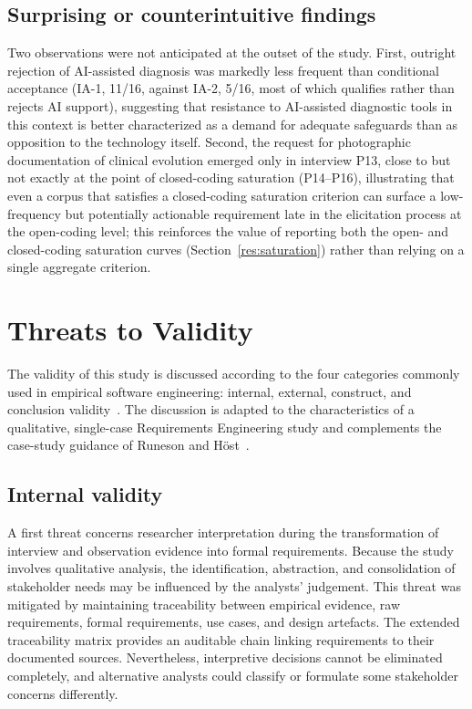 \documentclass[pdflatex,sn-mathphys-num,Numbered]{sn-jnl}
\begin{document}
\subsection{Surprising or counterintuitive findings}\label{disc:surprising}

Two observations were not anticipated at the outset of the study. First, outright rejection of AI-assisted diagnosis was markedly less frequent than conditional acceptance (IA-1, 11/16, against IA-2, 5/16, most of which qualifies rather than rejects AI support), suggesting that resistance to AI-assisted diagnostic tools in this context is better characterized as a demand for adequate safeguards than as opposition to the technology itself. Second, the request for photographic documentation of clinical evolution emerged only in interview P13, close to but not exactly at the point of closed-coding saturation (P14--P16), illustrating that even a corpus that satisfies a closed-coding saturation criterion can surface a low-frequency but potentially actionable requirement late in the elicitation process at the open-coding level; this reinforces the value of reporting both the open- and closed-coding saturation curves (Section~\ref{res:saturation}) rather than relying on a single aggregate criterion.


\section{Threats to Validity}\label{sec6}

The validity of this study is discussed according to the four categories commonly used in empirical software engineering: internal, external, construct, and conclusion validity~\cite{wohlin2012,siegmund2015}. The discussion is adapted to the characteristics of a qualitative, single-case Requirements Engineering study and complements the case-study guidance of Runeson and H\"ost~\cite{runeson2009}.

\subsection{Internal validity}\label{tv:internal}

A first threat concerns researcher interpretation during the transformation of interview and observation evidence into formal requirements. Because the study involves qualitative analysis, the identification, abstraction, and consolidation of stakeholder needs may be influenced by the analysts' judgement. This threat was mitigated by maintaining traceability between empirical evidence, raw requirements, formal requirements, use cases, and design artefacts. The extended traceability matrix provides an auditable chain linking requirements to their documented sources. Nevertheless, interpretive decisions cannot be eliminated completely, and alternative analysts could classify or formulate some stakeholder concerns differently.
\end{document}
